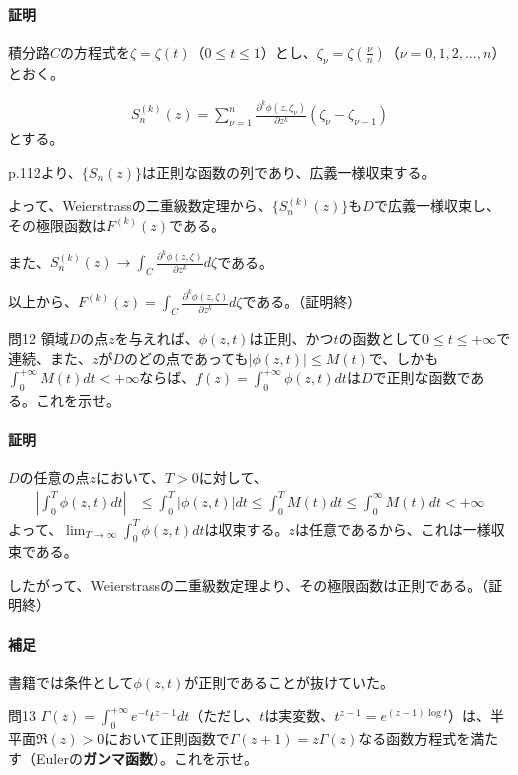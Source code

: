 \paragraph{証明}
積分路$C$の方程式を$\zeta=\zeta(t)$（$0\le t\le1$）とし、$\zeta_\nu=\zeta(\frac{\nu}{n})$（$\nu=0,1,2,\dots,n$）とおく。

\begin{align*}
    S^{(k)}_n(z)=\sum_{\nu=1}^{n}\frac{\partial^k \phi(z,\zeta_\nu)}{\partial z^k}(\zeta_\nu-\zeta_{\nu-1})
\end{align*}
とする。

p.112より、$\{S_n(z)\}$は正則な函数の列であり、広義一様収束する。

よって、Weierstrassの二重級数定理から、$\{S^{(k)}_n(z)\}$も$D$で広義一様収束し、その極限函数は$F^{(k)}(z)$である。

また、$S^{(k)}_n(z)\longrightarrow\int_{C}\frac{\partial^k\phi(z,\zeta)}{\partial z^k}d\zeta$である。

以上から、$F^{(k)}(z)=\int_{C}\frac{\partial^k\phi(z,\zeta)}{\partial z^k}d\zeta$である。（証明終）

\begin{mysimplebox}{問12}
    領域$D$の点$z$を与えれば、$\phi(z,t)$は正則、かつ$t$の函数として$0\le t\le+\infty$で連続、また、$z$が$D$のどの点であっても$|\phi(z,t)|\le M(t)$で、しかも$\int_{0}^{+\infty}M(t)dt<+\infty$ならば、$f(z)=\int_{0}^{+\infty}\phi(z,t)dt$は$D$で正則な函数である。これを示せ。
\end{mysimplebox}
\paragraph{証明}
$D$の任意の点$z$において、$T>0$に対して、
\begin{align*}
    \left|\int_{0}^{T}\phi(z,t)dt\right|
    &\le\int_{0}^{T}|\phi(z,t)|dt
    \le\int_{0}^{T}M(t)dt
    \le\int_{0}^{\infty}M(t)dt<+\infty
\end{align*}
よって、$\lim_{T\to\infty}\int_{0}^{T}\phi(z,t)dt$は収束する。$z$は任意であるから、これは一様収束である。

したがって、Weierstrassの二重級数定理より、その極限函数は正則である。（証明終）

\paragraph{補足}
書籍では条件として$\phi(z,t)$が正則であることが抜けていた。


\begin{mysimplebox}{問13}
    $\Gamma(z)=\int_{0}^{+\infty}e^{-t}t^{z-1}dt$（ただし、$t$は実変数、$t^{z-1}=e^{(z-1)\log t}$）は、半平面$\Re(z)>0$において正則函数で$\Gamma(z+1)=z\Gamma(z)$なる函数方程式を満たす（Eulerの\textbf{ガンマ函数}）。これを示せ。
\end{mysimplebox}
